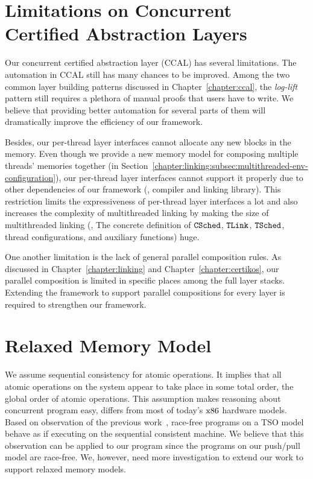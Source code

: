 \section{Limitations on Concurrent Certified Abstraction Layers}

Our concurrent certified abstraction layer (CCAL) has several limitations.
The automation in CCAL still has many chances to be improved. 
Among the two common layer building patterns discussed in Chapter~\ref{chapter:ccal},
the \textit{log-lift} pattern still requires a plethora of manual proofs that users have to write.
We believe that providing better automation for several parts of them will
dramatically improve the efficiency of our framework.  

Besides, our per-thread layer interfaces cannot allocate 
any new blocks in the memory.
Even though we provide a new memory model for composing 
multiple threads' memories together (in Section~\ref{chapter:linking:subsec:multithreaded-env-configuration}),
our per-thread layer interfaces cannot support it properly due to other dependencies 
of our framework (\ie, compiler and linking library).
This restriction limits the expressiveness of per-thread layer interfaces a lot 
and also increases the complexity of multithreaded linking by
making the size  of multithreaded linking (\ie, The concrete definition of 
${{\mathrm{\texttt{CSched}}}}$, ${{\mathrm{\texttt{TLink}}}}$, ${{\mathrm{\texttt{TSched}}}}$,  thread configurations, and auxiliary functions) huge. 

One another limitation is the lack of general parallel composition rules. 
As discussed in Chapter~\ref{chapter:linking} and Chapter~\ref{chapter:certikos}, 
our parallel composition is limited in specific places among the full layer stacks. 
Extending the framework to support parallel compositions for every layer is required to strengthen our framework.

\section{Relaxed Memory Model}


We assume sequential consistency for atomic operations. 
It implies that all atomic operations on the system
appear to take place in some total order,
the global order of atomic operations.
This assumption makes reasoning about concurrent program easy, 
differs from most of today's $\mathrm{x86}$ hardware models.
Based on observation of the previous work~\cite{sevcik13}, 
race-free programs on a TSO model behave as if executing on the sequential consistent machine.
We believe that this observation can be applied to our program since the programs
on our push/pull model are race-free.
We, however, need more investigation to extend our work to support relaxed memory models. 


